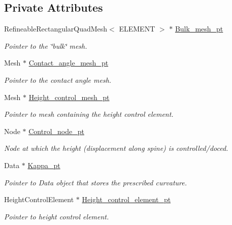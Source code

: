 \subsection*{Private Attributes}
\begin{DoxyCompactItemize}
\item 
Refineable\+Rectangular\+Quad\+Mesh$<$ E\+L\+E\+M\+E\+NT $>$ $\ast$ \hyperlink{classRefineableYoungLaplaceProblem_a251d9473d70dea7bfb36d9f0b4bb412d}{Bulk\+\_\+mesh\+\_\+pt}
\begin{DoxyCompactList}\small\item\em Pointer to the \char`\"{}bulk\char`\"{} mesh. \end{DoxyCompactList}\item 
Mesh $\ast$ \hyperlink{classRefineableYoungLaplaceProblem_a36f5dc0f7071ac15fd63c7c477f77fb0}{Contact\+\_\+angle\+\_\+mesh\+\_\+pt}
\begin{DoxyCompactList}\small\item\em Pointer to the contact angle mesh. \end{DoxyCompactList}\item 
Mesh $\ast$ \hyperlink{classRefineableYoungLaplaceProblem_ae2ae72b9b685c052b6a86892f64c2d85}{Height\+\_\+control\+\_\+mesh\+\_\+pt}
\begin{DoxyCompactList}\small\item\em Pointer to mesh containing the height control element. \end{DoxyCompactList}\item 
Node $\ast$ \hyperlink{classRefineableYoungLaplaceProblem_af14d838e5d4a1b9df2595bb08fa5e99d}{Control\+\_\+node\+\_\+pt}
\begin{DoxyCompactList}\small\item\em Node at which the height (displacement along spine) is controlled/doced. \end{DoxyCompactList}\item 
Data $\ast$ \hyperlink{classRefineableYoungLaplaceProblem_a0d667f8f0c41048740c5344619e27584}{Kappa\+\_\+pt}
\begin{DoxyCompactList}\small\item\em Pointer to Data object that stores the prescribed curvature. \end{DoxyCompactList}\item 
Height\+Control\+Element $\ast$ \hyperlink{classRefineableYoungLaplaceProblem_ab97cbf6dc6490194591b03c45642e147}{Height\+\_\+control\+\_\+element\+\_\+pt}
\begin{DoxyCompactList}\small\item\em Pointer to height control element. \end{DoxyCompactList}\item 

\end{DoxyCompactItemize}
